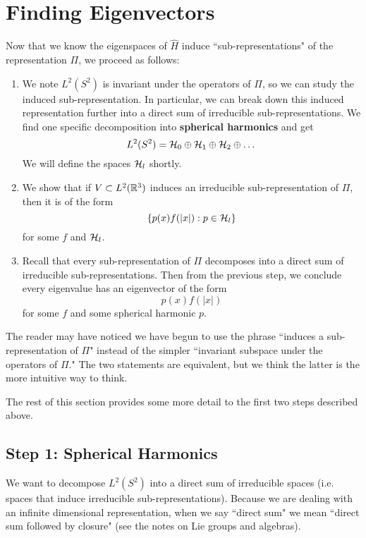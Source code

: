 \section{Finding Eigenvectors}
Now that we know the eigenspaces of $\hat{H}$ induce ``sub-representations" of the representation $\Pi$, we proceed as follows:
\begin{enumerate}
    \item We note $L^2(S^2)$ is invariant under the operators of $\Pi$, so we can study the induced sub-representation. In particular, we can break down this induced representation further into a direct sum of irreducible sub-representations. We find one specific decomposition into \textbf{spherical harmonics} and get
        \[
            L^2(S^2) = {\mathcal H}_0 \oplus {\mathcal H}_1 \oplus {\mathcal H}_2 \oplus \dots
        \]
        We will define the spaces ${\mathcal H}_l$ shortly.

    \item We show that if $V \subset L^2({\mathbb R}^3)$ induces an irreducible sub-representation of $\Pi$, then it is of the form
        \[
            \{p(x)f(|x|): p \in {\mathcal H}_l\}
        \]
        for some $f$ and ${\mathcal H}_l$.

    \item Recall that every sub-representation of $\Pi$ decomposes into a direct sum of irreducible sub-representations. Then from the previous step, we conclude every eigenvalue has an eigenvector of the form
        \[
            p(x)f(|x|)
        \]
        for some $f$ and some spherical harmonic $p$.
\end{enumerate}
The reader may have noticed we have begun to use the phrase ``induces a sub-representation of $\Pi$" instead of the simpler ``invariant subspace under the operators of $\Pi$." The two statements are equivalent, but we think the latter is the more intuitive way to think.

The rest of this section provides some more detail to the first two steps described above.

\subsection{Step 1: Spherical Harmonics}
We want to decompose $L^2(S^2)$ into a direct sum of irreducible spaces (i.e. spaces that induce irreducible sub-representations). Because we are dealing with an infinite dimensional representation, when we say ``direct sum" we mean ``direct sum followed by closure" (see the notes on Lie groups and algebras).

